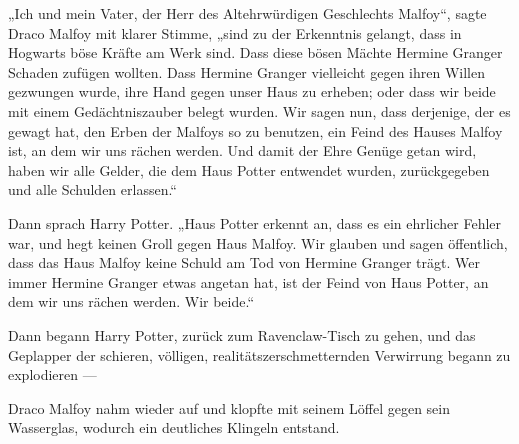 „Ich und mein Vater, der Herr des Altehrwürdigen Geschlechts Malfoy“, sagte Draco Malfoy mit klarer Stimme, „sind zu der Erkenntnis gelangt, dass in Hogwarts böse Kräfte am Werk sind. Dass diese bösen Mächte Hermine Granger Schaden zufügen wollten. Dass Hermine Granger vielleicht gegen ihren Willen gezwungen wurde, ihre Hand gegen unser Haus zu erheben; oder dass wir beide mit einem Gedächtniszauber belegt wurden. Wir sagen nun, dass derjenige, der es gewagt hat, den Erben der Malfoys so zu benutzen, ein Feind des Hauses Malfoy ist, an dem wir uns rächen werden. Und damit der Ehre Genüge getan wird, haben wir alle Gelder, die dem Haus Potter entwendet wurden, zurückgegeben und alle Schulden erlassen.“

Dann sprach Harry Potter.
„Haus Potter erkennt an, dass es ein ehrlicher Fehler war, und hegt keinen Groll gegen Haus Malfoy. Wir glauben und sagen öffentlich, dass das Haus Malfoy keine Schuld am Tod von Hermine Granger trägt. Wer immer Hermine Granger etwas angetan hat, ist der Feind von Haus Potter, an dem wir uns rächen werden. Wir beide.“

Dann begann Harry Potter, zurück zum Ravenclaw-Tisch zu gehen, und das Geplapper der schieren, völligen, realitätszerschmetternden Verwirrung begann zu explodieren —

Draco Malfoy nahm wieder auf und klopfte mit seinem Löffel gegen sein Wasserglas, wodurch ein deutliches Klingeln entstand.

